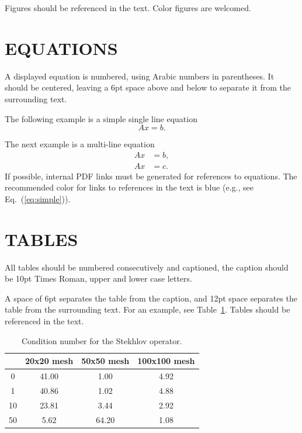 \documentclass[oneside,a4paper,english,links]{amca}
\begin{document}
Figures should be referenced in the text. Color figures are welcomed.

\section{EQUATIONS}

A displayed equation is numbered, using Arabic numbers in parentheses.
It should be  centered, leaving a 6pt space above and below to separate it from
the surrounding text.

The following example is a simple single line
equation
%
\begin{equation}
Ax = b.
\end{equation}

The next example is a multi-line equation
%
\begin{equation} \label{eq:simple}  
\begin{aligned}
Ax& = b,\\
Ax& = c.
\end{aligned}
\end{equation}
%
If possible, internal PDF links must be generated for references to
equations. The recommended color for links to references in the text
is blue (e.g., see Eq.~(\ref{eq:simple})).

\section{TABLES}

All tables should be numbered consecutively and captioned, the caption
should be 10pt Times Roman, upper and lower case letters.

A space of 6pt separates the table from the caption, and 12pt space
separates the table from the surrounding text. For an example, see
Table~\ref{tab:n50}. Tables should be referenced in the text.

\begin{table}[htb]
\centering
\begin{tabular}{|c|c|c|c|}
\hline  & 20x20 mesh & 50x50 mesh & 100x100 mesh\\
\hline
\hline
 0 & 41.00 & 1.00 & 4.92\\
\hline
 1 & 40.86 & 1.02 & 4.88 \\
\hline
10 & 23.81 & 3.44 & 2.92 \\
\hline
50 & 5.62 & 64.20 & 1.08 \\
\hline
\end{tabular}
\caption{Condition number for the Stekhlov operator. }
\label{tab:n50}
\end{table}
\end{document}
